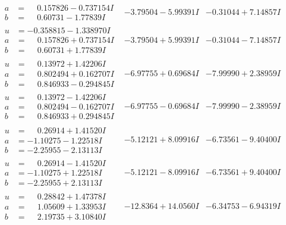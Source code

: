 \documentclass[1p]{elsarticle_modified}
\theoremstyle{definition}
\begin{document}
$$\begin{array}{c|c|c}
\begin{aligned}
a &= \phantom{-}0.157826 - 0.737154 I \\
b &= \phantom{-}0.60731 - 1.77839 I\end{aligned}
 & -3.79504 - 5.99391 I & -0.31044 + 7.14857 I \\ \hline\begin{aligned}
u &= -0.358815 - 1.338970 I \\
a &= \phantom{-}0.157826 + 0.737154 I \\
b &= \phantom{-}0.60731 + 1.77839 I\end{aligned}
 & -3.79504 + 5.99391 I & -0.31044 - 7.14857 I \\ \hline\begin{aligned}
u &= \phantom{-}0.13972 + 1.42206 I \\
a &= \phantom{-}0.802494 + 0.162707 I \\
b &= \phantom{-}0.846933 - 0.294845 I\end{aligned}
 & -6.97755 + 0.69684 I & -7.99990 + 2.38959 I \\ \hline\begin{aligned}
u &= \phantom{-}0.13972 - 1.42206 I \\
a &= \phantom{-}0.802494 - 0.162707 I \\
b &= \phantom{-}0.846933 + 0.294845 I\end{aligned}
 & -6.97755 - 0.69684 I & -7.99990 - 2.38959 I \\ \hline\begin{aligned}
u &= \phantom{-}0.26914 + 1.41520 I \\
a &= -1.10275 - 1.22518 I \\
b &= -2.25955 - 2.13113 I\end{aligned}
 & -5.12121 + 8.09916 I & -6.73561 - 9.40400 I \\ \hline\begin{aligned}
u &= \phantom{-}0.26914 - 1.41520 I \\
a &= -1.10275 + 1.22518 I \\
b &= -2.25955 + 2.13113 I\end{aligned}
 & -5.12121 - 8.09916 I & -6.73561 + 9.40400 I \\ \hline\begin{aligned}
u &= \phantom{-}0.28842 + 1.47378 I \\
a &= \phantom{-}1.05609 + 1.33953 I \\
b &= \phantom{-}2.19735 + 3.10840 I\end{aligned}
 & -12.8364 + 14.0560 I & -6.34753 - 6.94319 I \\ \hline\begin{aligned}

\end{aligned}
\end{array}$$
\end{document}
